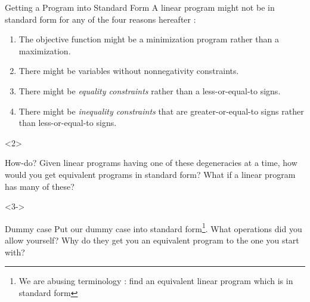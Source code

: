 \documentclass[aspectratio = 169]{beamer}
\begin{document}
\begin{frame}{Getting a Program into Standard Form}
  A linear program might not be in standard form for any of the four
  reasons hereafter :
  \begin{enumerate}
  \item The objective function might be a minimization program
    rather than a maximization.
  \item There might be variables without nonnegativity constraints.
  \item There might be \textit{equality constraints} rather than a
    less-or-equal-to signs.
  \item There might be \textit{inequality constraints} that are
    greater-or-equal-to signs rather than less-or-equal-to signs.
  \end{enumerate}
  \vspace{1em}
  \begin{overlayarea}{\textwidth}{.3\textheight}
    \begin{onlyenv}<2>
      \begin{halfshyblock}{How-do?}
        Given linear programs having one of these degeneracies at a
        time, how would you get equivalent programs in standard
        form? What if a linear program has many of these?
      \end{halfshyblock}
    \end{onlyenv}
    \begin{onlyenv}<3->
      \begin{halfshyblock}{Dummy case}
        Put our dummy case into standard form\footnote{We are abusing
          terminology : find an equivalent linear program which is in
          standard form}. What operations did you allow yourself? Why
        do they get you an equivalent program to the one you start
        with?
      \end{halfshyblock}
    \end{onlyenv}
  \end{overlayarea}
\end{frame}
\end{document}
